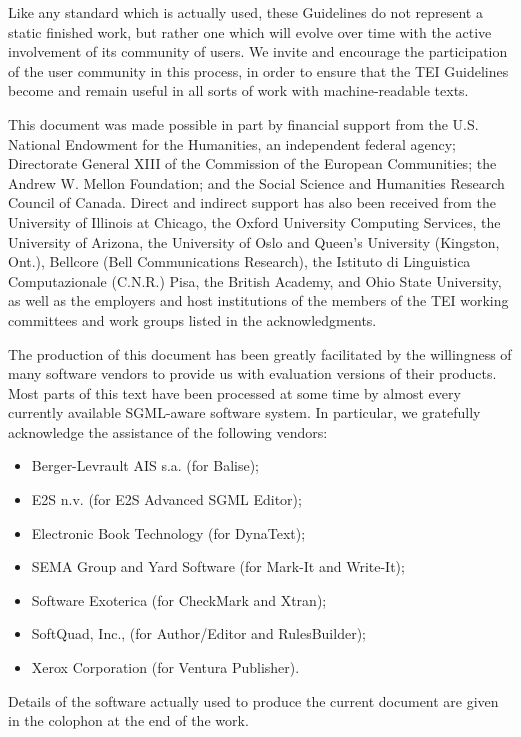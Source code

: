 Like any standard which is actually used, these Guidelines do not represent a static finished work, but rather one which will evolve over time with the active involvement of its community of users. We invite and encourage the participation of the user community in this process, in order to ensure that the TEI Guidelines become and remain useful in all sorts of work with machine-readable texts. \par
This document was made possible in part by financial support from the U.S. National Endowment for the Humanities, an independent federal agency; Directorate General XIII of the Commission of the European Communities; the Andrew W. Mellon Foundation; and the Social Science and Humanities Research Council of Canada. Direct and indirect support has also been received from the University of Illinois at Chicago, the Oxford University Computing Services, the University of Arizona, the University of Oslo and Queen's University (Kingston, Ont.), Bellcore (Bell Communications Research), the Istituto di Linguistica Computazionale (C.N.R.) Pisa, the British Academy, and Ohio State University, as well as the employers and host institutions of the members of the TEI working committees and work groups listed in the acknowledgments. \par
The production of this document has been greatly facilitated by the willingness of many software vendors to provide us with evaluation versions of their products. Most parts of this text have been processed at some time by almost every currently available SGML-aware software system. In particular, we gratefully acknowledge the assistance of the following vendors: \begin{itemize}
\item Berger-Levrault AIS s.a. (for Balise);
\item E2S n.v. (for E2S Advanced SGML Editor);
\item Electronic Book Technology (for DynaText);
\item SEMA Group and Yard Software (for Mark-It and Write-It);
\item Software Exoterica (for CheckMark and Xtran);
\item SoftQuad, Inc., (for Author/Editor and RulesBuilder);
\item Xerox Corporation (for Ventura Publisher).
\end{itemize} \par
Details of the software actually used to produce the current document are given in the colophon at the end of the work.
